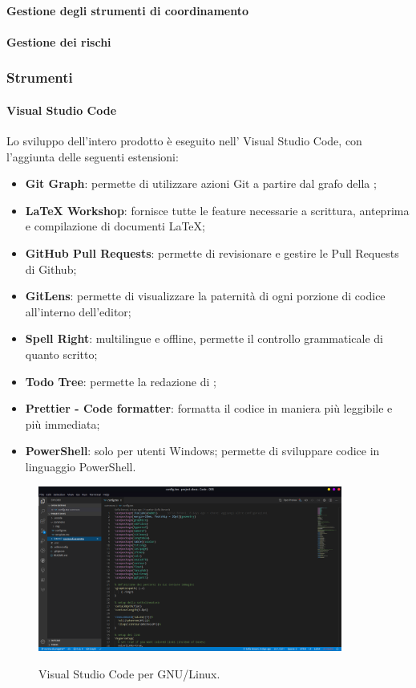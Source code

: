 \documentclass[../norme-di-progetto.tex]{subfiles}
\begin{document}
\paragraph{Gestione degli strumenti di coordinamento}

\paragraph{Gestione dei rischi}

\subsubsection{Strumenti}
\paragraph{Visual Studio Code}
Lo sviluppo dell'intero prodotto è eseguito nell' Visual Studio Code, con l'aggiunta delle seguenti estensioni:
\begin{itemize}
  \item \textbf{Git Graph}: permette di utilizzare azioni Git a partire dal grafo della ;
  \item \textbf{LaTeX Workshop}: fornisce tutte le feature necessarie a scrittura, anteprima e compilazione di documenti \LaTeX;
  \item \textbf{GitHub Pull Requests}: permette di revisionare e gestire le Pull Requests di Github;
  \item \textbf{GitLens}: permette di visualizzare la paternità di ogni porzione di codice all'interno dell'editor;
  \item \textbf{Spell Right}:  multilingue e offline, permette il controllo grammaticale di quanto scritto;
  \item \textbf{Todo Tree}: permette la redazione di ;
  \item \textbf{Prettier - Code formatter}: formatta il codice in maniera più leggibile e più immediata;
  \item \textbf{PowerShell}: solo per utenti Windows; permette di sviluppare codice in linguaggio PowerShell.
\end{itemize}

\begin{figure}[H]
  \centering
  \includegraphics[width=10cm]{img/vscode.png}
  \label{fig:github}
  \caption{Visual Studio Code per GNU/Linux.}
\end{figure}
\end{document}

